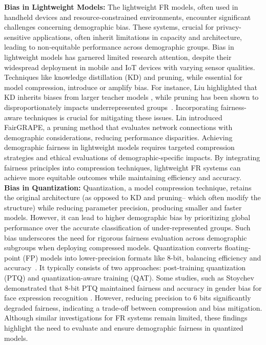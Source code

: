 \noindent\textbf{Bias in Lightweight Models:}
The lightweight FR models, often used in handheld devices and
resource-constrained environments, encounter significant challenges concerning
demographic bias. These systems, crucial for privacy-sensitive applications,
often inherit limitations in capacity and architecture, leading to non-equitable
performance across demographic groups.  Bias in lightweight models has garnered
limited research attention, despite their widespread deployment in mobile and
IoT devices with varying sensor qualities. Techniques like knowledge
distillation (KD) and pruning, while essential for model compression, introduce
or amplify bias. For instance, Liu \etal highlighted that KD inherits biases
from larger teacher models \cite{liu2021rectifying}, while pruning has been
shown to disproportionately impacts underrepresented
groups~\cite{paganini2020prune, iofinova2023bias}.
%
Incorporating fairness-aware techniques is crucial for mitigating these issues.
Lin \etal \cite{lin2022fairgrape} introduced FairGRAPE, a pruning method that
evaluates network connections with demographic considerations, reducing
performance disparities. Achieving demographic fairness in lightweight models
requires targeted compression strategies and ethical evaluations of
demographic-specific impacts. By integrating fairness principles into
compression techniques, lightweight FR systems can achieve more equitable
outcomes while maintaining efficiency and accuracy.\\


\noindent\textbf{Bias in Quantization:}
Quantization, a model compression technique, retains the original architecture
(as opposed to KD and pruning-- which often modify the structure) while reducing
parameter precision, producing smaller and faster models. However, it can lead
to higher demographic bias by prioritizing global performance over the accurate
classification of under-represented groups. Such bias underscores the need for
rigorous fairness evaluation across demographic subgroups when deploying
compressed models.
%
Quantization converts floating-point (FP) models into lower-precision formats
like 8-bit, balancing efficiency and accuracy~\cite{jacob2018quantization}. It
typically consists of two approaches: post-training quantization (PTQ) and
quantization-aware training (QAT). 
Some studies, such as Stoychev \etal demonstrated that 8-bit PTQ maintained
fairness and accuracy in gender bias for face expression recognition
\cite{jacob2018quantization}. However, reducing precision to 6 bits
significantly degraded fairness, indicating a trade-off between compression and
bias mitigation. Although similar investigations for FR systems remain limited,
these findings highlight the need to evaluate and ensure demographic fairness in
quantized models.\\

